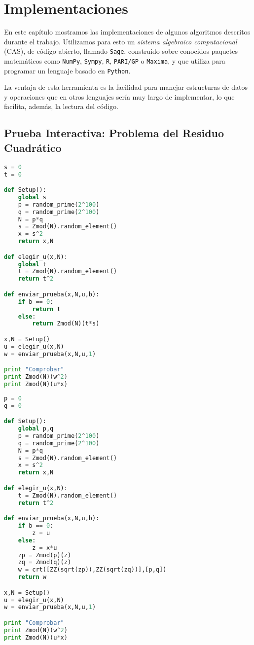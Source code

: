 \chapter{Implementaciones}\label{ch:implementaciones} 

En este capítulo mostramos las implementaciones de algunos algoritmos descritos durante el trabajo. Utilizamos para esto un \textit{sistema algebraico computacional} (CAS), de código abierto, llamado \texttt{Sage}, construido sobre conocidos paquetes matemáticos como \texttt{NumPy}, \texttt{Sympy}, \texttt{R}, \texttt{PARI/GP} o \texttt{Maxima}, y que utiliza para programar un lenguaje basado en \texttt{Python}.

La ventaja de esta herramienta es la facilidad para manejar estructuras de datos y operaciones que en otros lenguajes sería muy largo de implementar, lo que facilita, además, la lectura del código.


\section{Prueba Interactiva: Problema del Residuo Cuadrático}

\begin{lstlisting}[language=Python,frame=tb,caption={QR},label=lst:QR]
s = 0
t = 0

def Setup():
	global s
	p = random_prime(2^100)
	q = random_prime(2^100)
	N = p*q
	s = Zmod(N).random_element()
	x = s^2
	return x,N  

def elegir_u(x,N):
	global t
	t = Zmod(N).random_element()
	return t^2

def enviar_prueba(x,N,u,b):
	if b == 0:
		return t
	else:
		return Zmod(N)(t*s)

x,N = Setup()
u = elegir_u(x,N)
w = enviar_prueba(x,N,u,1)

print "Comprobar"
print Zmod(N)(w^2)
print Zmod(N)(u*x)

\end{lstlisting}




\begin{lstlisting}[language=Python,frame=tb,caption={QR2},label=lst:QR2]
p = 0
q = 0

def Setup():
	global p,q
	p = random_prime(2^100)
	q = random_prime(2^100)
	N = p*q
	s = Zmod(N).random_element()
	x = s^2
	return x,N  

def elegir_u(x,N):
	t = Zmod(N).random_element()
	return t^2

def enviar_prueba(x,N,u,b):
	if b == 0:
		z = u
	else:
		z = x*u
	zp = Zmod(p)(z)
	zq = Zmod(q)(z)
	w = crt([ZZ(sqrt(zp)),ZZ(sqrt(zq))],[p,q])
	return w

x,N = Setup()
u = elegir_u(x,N)
w = enviar_prueba(x,N,u,1)

print "Comprobar"
print Zmod(N)(w^2)
print Zmod(N)(u*x)

\end{lstlisting}


